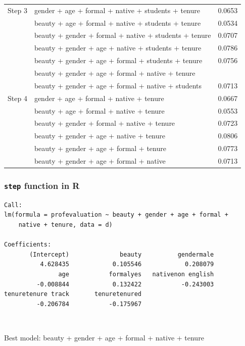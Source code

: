 \begin{frame}[shrink]
{\begin{tabular}{l | l | c}
\hline
Step 3	& gender + age + formal + native + students + tenure 					& 0.0653 \\
		& beauty + age + formal + native + students + tenure					& 0.0534 \\
		& beauty + gender + formal + native + students + tenure					& 0.0707 \\
		& beauty + gender + age + native + students + tenure					& 0.0786 \\
		& beauty + gender + age + formal + students + tenure					& 0.0756 \\
		& beauty + gender + age + formal + native + tenure						& \red{0.0855} \\
		& beauty + gender + age + formal + native + students					& 0.0713 \pause \\
\hline
Step 4	& gender + age + formal + native + tenure 							& 0.0667 \\
		& beauty + age + formal + native + tenure								& 0.0553 \\
		& beauty + gender + formal + native + tenure							& 0.0723 \\
		& beauty + gender + age + native + tenure							& 0.0806 \\
		& beauty + gender + age + formal + tenure							& 0.0773 \\
		& beauty + gender + age + formal + native							& 0.0713 \\
\end{tabular}
}

\end{frame}


\begin{frame}[fragile]
\frametitle{\texttt{step} function in R}

{\scriptsize
\begin{verbatim}
Call:
lm(formula = profevaluation ~ beauty + gender + age + formal + 
    native + tenure, data = d)

Coefficients:
       (Intercept)              beauty          gendermale  
          4.628435            0.105546            0.208079  
               age           formalyes   nativenon english  
         -0.008844            0.132422           -0.243003  
tenuretenure track       tenuretenured  
         -0.206784           -0.175967  
\end{verbatim}
}

$\:$

\pause
Best model: beauty + gender + age + formal + native + tenure

\end{frame}

